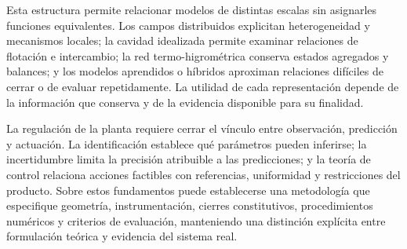 Esta estructura permite relacionar modelos de distintas escalas sin asignarles funciones equivalentes. Los campos distribuidos explicitan heterogeneidad y mecanismos locales; la cavidad idealizada permite examinar relaciones de flotación e intercambio; la red termo-higrométrica conserva estados agregados y balances; y los modelos aprendidos o híbridos aproximan relaciones difíciles de cerrar o de evaluar repetidamente. La utilidad de cada representación depende de la información que conserva y de la evidencia disponible para su finalidad.

La regulación de la planta requiere cerrar el vínculo entre observación, predicción y actuación. La identificación establece qué parámetros pueden inferirse; la incertidumbre limita la precisión atribuible a las predicciones; y la teoría de control relaciona acciones factibles con referencias, uniformidad y restricciones del producto. Sobre estos fundamentos puede establecerse una metodología que especifique geometría, instrumentación, cierres constitutivos, procedimientos numéricos y criterios de evaluación, manteniendo una distinción explícita entre formulación teórica y evidencia del sistema real.
